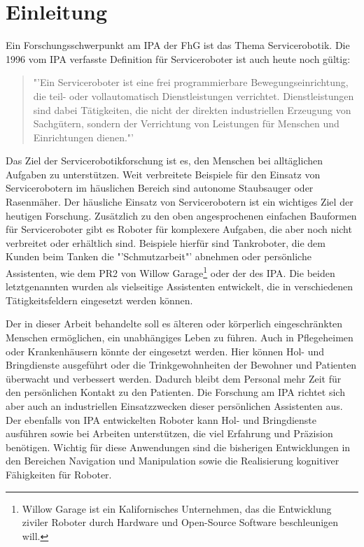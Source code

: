 
\chapter{Einleitung}
Ein Forschungsschwerpunkt am \ac{IPA} der \ac{FhG} ist das Thema 
Servicerobotik. Die 1996 vom \ac{IPA} verfasste Definition für Serviceroboter 
ist auch heute noch gültig:

\begin{quote}"'Ein Serviceroboter ist 
eine frei programmierbare Bewegungseinrichtung, die teil- oder vollautomatisch 
Dienstleistungen verrichtet. Dienstleistungen sind dabei Tätigkeiten, die nicht 
der direkten industriellen Erzeugung von Sachgütern, sondern der Verrichtung von 
Leistungen für Menschen und Einrichtungen dienen."'\cite{Schraft1996}\end{quote} 

Das Ziel der Servicerobotikforschung ist es, den Menschen bei alltäglichen Aufgaben zu 
unterstützen. Weit verbreitete Beispiele für den Einsatz von Servicerobotern im 
häuslichen Bereich sind autonome Staubsauger oder Rasenmäher. Der häusliche 
Einsatz von Servicerobotern ist ein wichtiges Ziel der heutigen Forschung. 
Zusätzlich zu den oben angesprochenen einfachen Bauformen für Serviceroboter 
gibt es Roboter für komplexere Aufgaben, die aber noch nicht verbreitet oder 
erhältlich sind. Beispiele hierfür sind Tankroboter, die dem Kunden beim Tanken 
die "'Schmutzarbeit"'\nocite{tankpitstop} abnehmen oder persönliche Assistenten, 
wie dem PR2 von Willow Garage\footnote{Willow Garage ist ein Kalifornisches 
Unternehmen, das die Entwicklung ziviler Roboter durch Hardware und Open-Source
Software beschleunigen will.} oder der \cob des \ac{IPA}. Die beiden letztgenannten 
wurden als vielseitige Assistenten entwickelt, die in verschiedenen 
Tätigkeitsfeldern eingesetzt werden können. 

Der in dieser Arbeit behandelte \cob 
soll es älteren oder körperlich eingeschränkten Menschen ermöglichen, ein 
unabhängiges Leben zu führen. Auch in Pflegeheimen oder 
Krankenhäusern könnte der \cob eingesetzt werden. Hier können Hol- und Bringdienste ausgeführt oder die 
Trinkgewohnheiten der Bewohner und Patienten überwacht und verbessert werden. Dadurch 
bleibt dem Personal mehr Zeit für den persönlichen Kontakt zu den Patienten. Die 
Forschung am \ac{IPA} richtet sich aber auch an industriellen Einsatzzwecken 
dieser persönlichen Assistenten aus. Der ebenfalls von \ac{IPA} entwickelten 
Roboter \raw kann Hol- und Bringdienste ausführen sowie bei Arbeiten unterstützen, 
die viel Erfahrung und Präzision benötigen. Wichtig für diese Anwendungen 
sind die bisherigen Entwicklungen in den Bereichen Navigation und Manipulation 
sowie die Realisierung kognitiver Fähigkeiten für Roboter.


